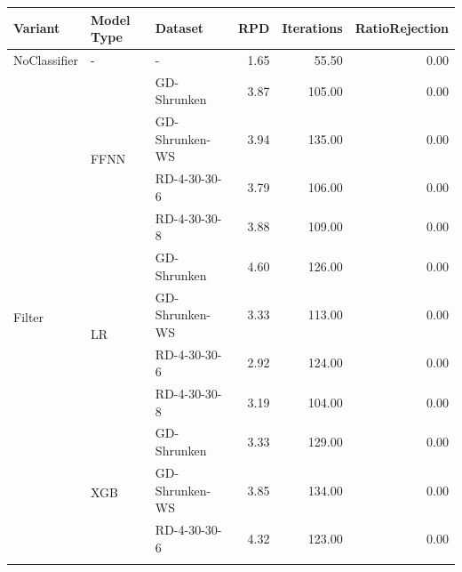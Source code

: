 \begin{table}[ht]
	\scriptsize
	\centering
	\begin{tabular}{lllrrr}
		\toprule
		\textbf{Variant}             & \textbf{Model Type}      & \textbf{Dataset} & \textbf{RPD} & \textbf{Iterations} & \textbf{RatioRejection} \\
		\midrule
		NoClassifier                 & -                        & -                & 1.65         & 55.50               & 0.00                    \\\midrule
		\multirow[t]{12}{*}{Filter}  & \multirow[t]{4}{*}{FFNN} & GD-Shrunken      & 3.87         & 105.00              & 0.00                    \\\cmidrule(lr){3-6}
		                             &                          & GD-Shrunken-WS   & 3.94         & 135.00              & 0.00                    \\\cmidrule(lr){3-6}
		                             &                          & RD-4-30-30-6     & 3.79         & 106.00              & 0.00                    \\\cmidrule(lr){3-6}
		                             &                          & RD-4-30-30-8     & 3.88         & 109.00              & 0.00                    \\\cmidrule(lr){2-6}
		                             & \multirow[t]{4}{*}{LR}   & GD-Shrunken      & 4.60         & 126.00              & 0.00                    \\\cmidrule(lr){3-6}
		                             &                          & GD-Shrunken-WS   & 3.33         & 113.00              & 0.00                    \\\cmidrule(lr){3-6}
		                             &                          & RD-4-30-30-6     & 2.92         & 124.00              & 0.00                    \\\cmidrule(lr){3-6}
		                             &                          & RD-4-30-30-8     & 3.19         & 104.00              & 0.00                    \\\cmidrule(lr){2-6}
		                             & \multirow[t]{4}{*}{XGB}  & GD-Shrunken      & 3.33         & 129.00              & 0.00                    \\\cmidrule(lr){3-6}
		                             &                          & GD-Shrunken-WS   & 3.85         & 134.00              & 0.00                    \\\cmidrule(lr){3-6}
		                             &                          & RD-4-30-30-6     & 4.32         & 123.00              & 0.00                    \\\cmidrule(lr){3-6}

\end{tabular}
\end{table}
